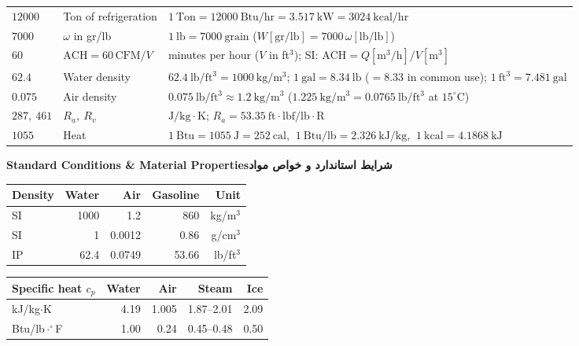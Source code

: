 \documentclass[9pt]{extarticle}
\renewcommand{\arraystretch}{1.1}
\newcommand{\fa}[1]{{\farsifont\beginR #1\endR}}
\newcommand{\sect}[2]{\par\Needspace{8\baselineskip}\vspace{3pt}\noindent\colorbox{hdr}{\parbox{\dimexpr\linewidth-2\fboxsep}{\bfseries #1\hfill\fa{\bfseries #2}}}\par\vspace{2pt}}
\begin{document}
{\begin{tabular}{@{}p{2.3cm}p{5.8cm}p{9.3cm}@{}}
$12000$ & Ton of refrigeration & $1\ \mathrm{Ton}=12000\ \mathrm{Btu/hr}=3.517\ \mathrm{kW}=3024\ \mathrm{kcal/hr}$\\
\rowcolor{zebra}$7000$ & $\omega$ in gr/lb & $1\ \mathrm{lb}=7000\ \mathrm{grain}$ \quad ($W[\mathrm{gr/lb}]=7000\,\omega[\mathrm{lb/lb}]$)\\
$60$ & $\mathrm{ACH}=60\,\mathrm{CFM}/V$ & minutes per hour ($V$ in ft$^3$); SI: $\mathrm{ACH}=Q[\mathrm{m^3/h}]/V[\mathrm{m^3}]$\\
\rowcolor{zebra}$62.4$ & Water density & $62.4\ \mathrm{lb/ft^3}=1000\ \mathrm{kg/m^3}$; $1\ \mathrm{gal}=8.34\ \mathrm{lb}$ ($=8.33$ in common use); $1\ \mathrm{ft^3}=7.481\ \mathrm{gal}$\\
$0.075$ & Air density & $0.075\ \mathrm{lb/ft^3}\approx1.2\ \mathrm{kg/m^3}$ ($1.225\ \mathrm{kg/m^3}=0.0765\ \mathrm{lb/ft^3}$ at $15^\circ$C)\\
\rowcolor{zebra}$287,\ 461$ & $R_a,\ R_v$ & $\mathrm{J/kg\cdot K}$; $R_a=53.35\ \mathrm{ft\cdot lbf/lb\cdot R}$\\
$1055$ & Heat & $1\ \mathrm{Btu}=1055\ \mathrm{J}=252\ \mathrm{cal}$, $\ 1\ \mathrm{Btu/lb}=2.326\ \mathrm{kJ/kg}$, $\ 1\ \mathrm{kcal}=4.1868\ \mathrm{kJ}$\\
\bottomrule\end{tabular}}

\medskip
\sect{Standard Conditions \& Material Properties}{شرایط استاندارد و خواص مواد}
{\convfont\renewcommand{\arraystretch}{1.3}\setlength{\tabcolsep}{6pt}
\noindent\begin{tabular}{@{}lrrrr@{}}\toprule
\rowcolor{hdr}\textbf{Density} & \textbf{Water} & \textbf{Air} & \textbf{Gasoline} & \textbf{Unit}\\ \midrule
SI & 1000 & 1.2 & 860 & kg/m$^3$\\
\rowcolor{zebra}SI & 1 & 0.0012 & 0.86 & g/cm$^3$\\
IP & 62.4 & 0.0749 & 53.66 & lb/ft$^3$\\ \bottomrule\end{tabular}\hspace{10mm}
\begin{tabular}{@{}lrrrr@{}}\toprule
\rowcolor{hdr}\textbf{Specific heat $c_p$} & \textbf{Water} & \textbf{Air} & \textbf{Steam} & \textbf{Ice}\\ \midrule
kJ/kg$\cdot$K & 4.19 & 1.005 & 1.87--2.01 & 2.09\\
\rowcolor{zebra}Btu/lb$\cdot^\circ$F & 1.00 & 0.24 & 0.45--0.48 & 0.50\\ \bottomrule\end{tabular}}
\medskip
\end{document}
